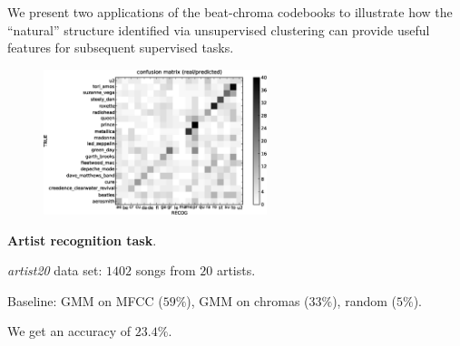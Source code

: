 \documentclass[portrait,a0b,final]{a0poster}
\newenvironment{poster}{
  \begin{center}
  \begin{minipage}[c]{0.98\textwidth}
}{
  \end{minipage} 
  \end{center}
}
\newcommand{\pbox}[4]{
\psshadowbox[#3]{
\begin{minipage}[t][#2][t]{#1}
#4
\end{minipage}
}}
\begin{document}
\begin{poster}
\begin{multicols}{3}
\vspace{2cm}
\begin{center}
  \pbox{0.8\columnwidth}{}{linewidth=2mm,framearc=0.1,linecolor=lightred,fillstyle=gradient,gradangle=0,gradbegin=white,gradend=whitepink,gradmidpoint=1.0,framesep=1em}{
    \begin{center}
      \LARGE Experiments
    \end{center}}
\end{center}

\vspace{1.0cm}

\begin{minipage}[c]{\columnwidth}

We present two applications of the beat-chroma codebooks
to illustrate how the ``natural'' structure identified via 
unsupervised clustering can provide useful 
features for subsequent supervised tasks.
\vspace{1cm}

\begin{figure}
  \vspace{-20pt}
  \begin{center}
    \includegraphics[width=0.58\textwidth]{conf_mat_per_artist.ps}
  \end{center}
  \vspace{-20pt}
\end{figure}

\textbf{Artist recognition task}.
\begin{list}{}{\leftmargin=2em =1em}
\item {\it artist20} data set: $1402$ songs from $20$ artists.
\item Baseline: GMM on MFCC ($59\%$), GMM on chromas ($33\%$),
random ($5\%$).
\item We get an accuracy of $\mathbf{23.4\%}$.
\end{list}
%


\end{minipage}
\end{multicols}
\end{poster}
\end{document}
